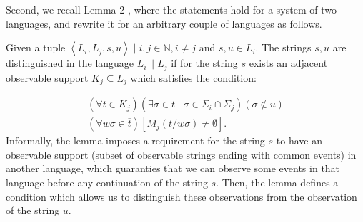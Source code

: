 \documentclass[a4paper, 10pt, conference]{ieeeconf}
\begin{document}
Second, we recall Lemma 2 \cite{myadzelets_virtual_2013}, where the statements
hold for a system of two languages, and rewrite it for an arbitrary couple
of languages as follows.

\begin{lemma}
\label{lem:distinguished}
Given a tuple $\left< L_i, L_j, s, u\right> \mid i, j \in \mathbb{N}, i\neq j$
and $s, u \in L_i$. The strings $s, u$ are
distinguished in the language $L_i \parallel L_j$ if for the string $s$ exists
an adjacent observable support $K_j \subseteq L_j$ which satisfies the
condition:
\end{lemma} 
\begin{equation}
\label{con:distinquished}
	\begin{array}{l}
	 	(\forall t \in K_j)
	 	(\exists \sigma \in t \mid \sigma \in \Sigma_i \cap \Sigma_j)
	 	(\sigma \not \in u)
	 	\\
	 	(\forall w\sigma \in \overline{t})
	 	[M_j(t / w\sigma) \neq \emptyset].
	\end{array}
\end{equation}
Informally, the lemma imposes a requirement for the string $s$ to have an
observable support (subset of observable strings ending with common events) in
another language, which guaranties that we can observe some events in that
language before any continuation of the string $s$.
Then, the lemma defines a condition which allows us to distinguish these
observations from the observation of the string $u$.
\end{document}
